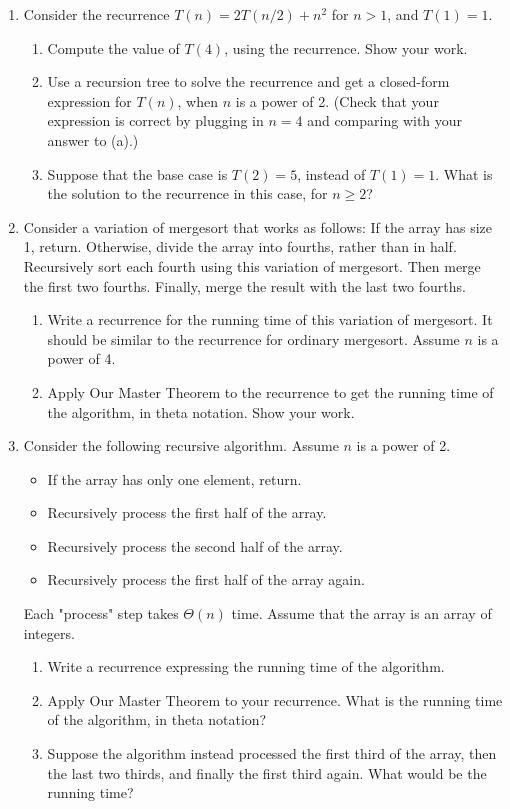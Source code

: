 \documentclass{article}
\begin{document}
\begin{enumerate}
    \item Consider the recurrence $T(n) = 2T(n/2) + n^2$ for $n > 1$, and $T(1) = 1$.
    \begin{enumerate}
        \item Compute the value of $T(4)$, using the recurrence. Show your work.
        \item Use a recursion tree to solve the recurrence and get a closed-form expression for $T(n)$, when $n$ is a power of 2. (Check that your expression is correct by plugging in $n = 4$ and comparing with your answer to (a).)
        \item Suppose that the base case is $T(2) = 5$, instead of $T(1) = 1$. What is the solution to the recurrence in this case, for $n \ge 2$?
    \end{enumerate}

    \item Consider a variation of mergesort that works as follows: If the array has size 1, return. Otherwise, divide the array into fourths, rather than in half. Recursively sort each fourth using this variation of mergesort. Then merge the first two fourths. Finally, merge the result with the last two fourths.
    \begin{enumerate}
        \item Write a recurrence for the running time of this variation of mergesort. It should be similar to the recurrence for ordinary mergesort. Assume $n$ is a power of 4.
        \item Apply Our Master Theorem to the recurrence to get the running time of the algorithm, in theta notation. Show your work.
    \end{enumerate}

    \item Consider the following recursive algorithm. Assume $n$ is a power of 2.
    \begin{itemize}
        \item If the array has only one element, return.
        \item Recursively process the first half of the array.
        \item Recursively process the second half of the array.
        \item Recursively process the first half of the array again.
    \end{itemize}
    Each "process" step takes $\Theta(n)$ time.  Assume that the array is an array of integers.
    \begin{enumerate}
        \item Write a recurrence expressing the running time of the algorithm.
        \item Apply Our Master Theorem to your recurrence. What is the running time of the algorithm, in theta notation?
        \item  Suppose the algorithm instead processed the first third of the array, then the last two thirds, and finally the first third again. What would be the running time?
    \end{enumerate}

\end{enumerate}
\end{document}
